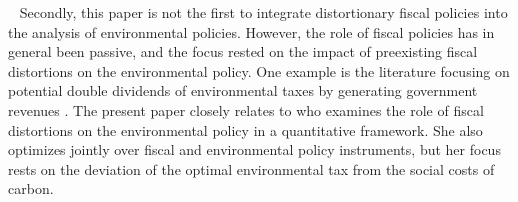 \
Secondly, this paper is not the first to integrate distortionary fiscal policies into the analysis of environmental policies. However, the role of fiscal policies has in general been passive, and the focus rested on the impact of preexisting fiscal distortions on the environmental policy. One example is the literature focusing on potential double dividends of environmental taxes by generating government revenues \citep[][]{Goulder1995EnvironmentalGuide, Bovenberg2002EnvironmentalRegulation}. 
The present paper closely relates to \cite{Barrage2019OptimalPolicy} who examines the role of fiscal distortions on the environmental policy in a quantitative framework. She also optimizes jointly over fiscal and environmental policy instruments, but her focus rests on the deviation of the optimal environmental tax from the social costs of carbon.


